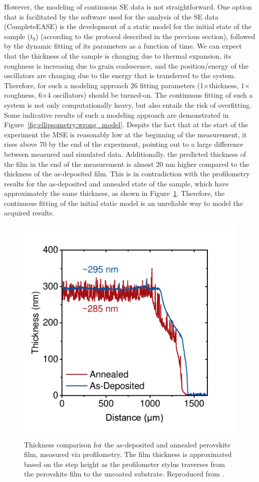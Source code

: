 However, the modeling of continuous SE data is not straightforward. One option that is facilitated by the software used for the analysis of the SE data (CompleteEASE) is the development of a static model for the initial state of the sample ($t_0$) (according to the protocol described in the previous section), followed by the dynamic fitting of its parameters as a function of time. We can expect that the thickness of the sample is changing due to thermal expansion, its roughness is increasing due to grain coalescence, and the position/energy of the oscillators are changing due to the energy that is transferred to the system. Therefore, for such a modeling approach 26 fitting parameters (1$\times$thickness, 1$\times$roughness, 6$\times$4 oscillators) should be turned-on. The continuous fitting of such a system is not only computationally heavy, but also entails the risk of overfitting. Some indicative results of such a modeling approach are demonstrated in Figure~\ref{fig:ellipsometry:wrong_model}. Despite the fact that at the start of the experiment the MSE is reasonably low at the beginning of the measurement, it rises above 70 by the end of the experiment, pointing out to a large difference between measured and simulated data. Additionally, the predicted thickness of the film in the end of the measurement is almost 20 nm higher compared to the thickness of the as-deposited film. This is in contradiction with the profilometry results for the as-deposited and annealed state of the sample, which have approximately the same thickness, as shown in Figure~\ref{fig:ellipsometry:profilometry}. Therefore, the continuous fitting of the initial static model is an unreliable way to model the acquired results. 


\begin{figure}
  \centering
  \medskip
  \includegraphics[width=.45\textwidth]{chapters/ellipsometry/image/Dektak.pdf}
  \caption[Thickness comparison for the as-deposited and annealed perovskite film, measured via profilometry.]{Thickness comparison for the as-deposited and annealed perovskite film, measured via profilometry. The film thickness is approximated based on the step height as the profilometer stylus traverses from the perovskite film to the uncoated substrate. Reproduced from \cite{Papadopoulou2024InEllipsometry}.}
  \label{fig:ellipsometry:profilometry}
\end{figure}

